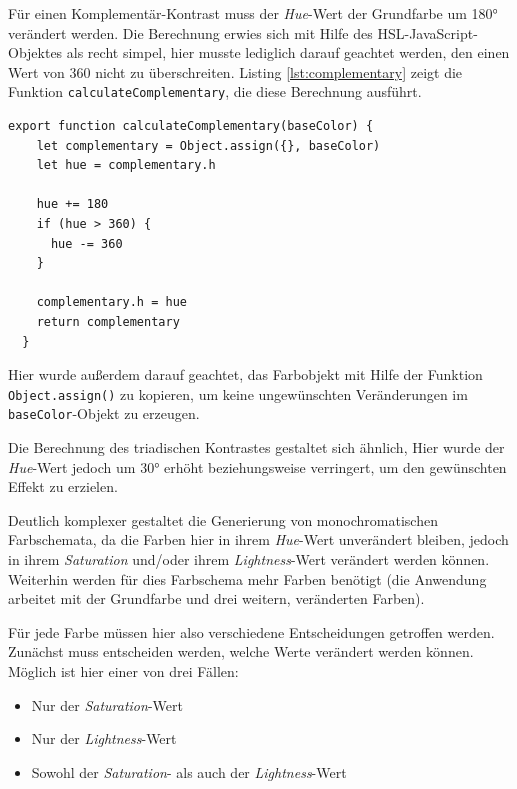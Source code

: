 Für einen Komplementär-Kontrast muss der \textit{Hue}-Wert der Grundfarbe um 180° verändert werden. Die Berechnung erwies sich mit Hilfe des HSL-JavaScript-Objektes als recht simpel, hier musste lediglich darauf geachtet werden, den einen Wert von 360 nicht zu überschreiten. Listing \ref{lst:complementary} zeigt die Funktion \verb|calculateComplementary|, die diese Berechnung ausführt.

\begin{lstlisting}[caption=Berechnung eines Komplementär-Kontrastes, label=lst:complementary]
  export function calculateComplementary(baseColor) {
    let complementary = Object.assign({}, baseColor)
    let hue = complementary.h

    hue += 180
    if (hue > 360) {
      hue -= 360
    }

    complementary.h = hue
    return complementary
  }
\end{lstlisting}

Hier wurde außerdem darauf geachtet, das Farbobjekt mit Hilfe der Funktion \verb|Object.assign()| zu kopieren, um keine ungewünschten Veränderungen im \verb|baseColor|-Objekt zu erzeugen\footnotemark{}.


Die Berechnung des triadischen Kontrastes gestaltet sich ähnlich, Hier wurde der \textit{Hue}-Wert jedoch um 30° erhöht beziehungsweise verringert, um den gewünschten Effekt zu erzielen.

Deutlich komplexer gestaltet die Generierung von monochromatischen Farbschemata, da die Farben hier in ihrem \textit{Hue}-Wert unverändert bleiben, jedoch in ihrem \textit{Saturation} und/oder ihrem \textit{Lightness}-Wert verändert werden können. Weiterhin werden für dies Farbschema mehr Farben benötigt (die Anwendung arbeitet mit der Grundfarbe und drei weitern, veränderten Farben).

Für jede Farbe müssen hier also verschiedene Entscheidungen getroffen werden. Zunächst muss entscheiden werden, welche Werte verändert werden können. Möglich ist hier einer von drei Fällen:

\begin{itemize}
  \item Nur der \textit{Saturation}-Wert
  \item Nur der \textit{Lightness}-Wert
  \item Sowohl der \textit{Saturation}- als auch der \textit{Lightness}-Wert
\end{itemize}

